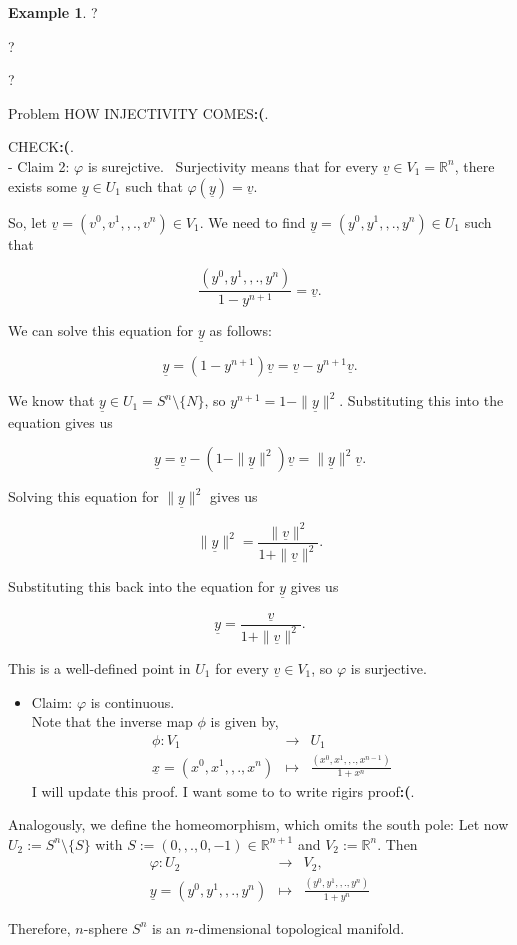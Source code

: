 \documentclass[
]{book}
\providecommand{\tightlist}{%
  \setlength{\itemsep}{0pt}\setlength{\parskip}{0pt}}
\theoremstyle{definition}
\theoremstyle{definition}
\newtheorem{example}{Example}[chapter]
\theoremstyle{definition}
\theoremstyle{definition}
\theoremstyle{remark}
\begin{document}
\begin{example}
?

?

?

{Problem HOW INJECTIVITY COMES\textbf{:(}}.

{CHECK\textbf{:(}}.\\
- Claim 2: \(\varphi\) is surejctive.~
Surjectivity means that for every \(\underline{v} \in V_1 = \mathbb{R}^n\), there exists some \(\underline{y} \in U_1\) such that \(\varphi(\underline{y}) = \underline{v}\).

So, let \(\underline{v} = (v^0, v^1, ,., v^n) \in V_1\). We need to find \(\underline{y} = (y^0, y^1, ,., y^n) \in U_1\) such that

\[\frac{(y^0, y^1, ,., y^n)}{1-y^{n+1}} = \underline{v}.\]

We can solve this equation for \(\underline{y}\) as follows:

\[\underline{y} = (1-y^{n+1})\underline{v} = \underline{v} - y^{n+1}\underline{v}.\]

We know that \(\underline{y} \in U_1 = S^n \setminus \{N\}\), so \(y^{n+1} = 1 - \|\underline{y}\|^2\). Substituting this into the equation gives us

\[\underline{y} = \underline{v} - (1 - \|\underline{y}\|^2)\underline{v} = \|\underline{y}\|^2\underline{v}.\]

Solving this equation for \(\|\underline{y}\|^2\) gives us

\[\|\underline{y}\|^2 = \frac{\|\underline{v}\|^2}{1 + \|\underline{v}\|^2}.\]

Substituting this back into the equation for \(\underline{y}\) gives us

\[\underline{y} = \frac{\underline{v}}{1 + \|\underline{v}\|^2}.\]

This is a well-defined point in \(U_1\) for every \(\underline{v} \in V_1\), so \(\varphi\) is surjective.

\begin{itemize}
\tightlist
\item
  Claim: \(\varphi\) is continuous.\\
  Note that the inverse map \(\phi\) is given by,
  \begin{eqnarray}
  \phi : V_1 &\rightarrow & U_1\\
  \underline{x}= (x^0, x^1, ,. , x^n) &\mapsto & \frac{(x^0,x^1,,.,x^{n-1})}{1 + x^n} 
  \end{eqnarray}
  {I will update this proof. I want some to to write rigirs proof\textbf{:(}}.
\end{itemize}

Analogously, we define the homeomorphism, which omits the south pole:
Let now \(U_2 := S^n \setminus \{S\}\) with \(S := ( 0,,. , 0, -1) \in \mathbb{R}^{n+1}\) and \(V_2 := \mathbb{R}^n\).
Then
\begin{eqnarray}
\varphi : U_2 &\rightarrow & V_2,\\
\underline{y}= (y^0, y^1, ,. , y^n) &\mapsto & \frac{(y^0,y^1,,.,y^n)}{1 + y^n} 
\end{eqnarray}

Therefore, \(n\)-sphere \(S^n\) is an \(n\)-dimensional topological manifold.
\end{example}
\end{document}
